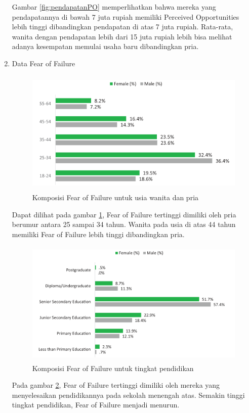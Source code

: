 \begin{enumerate}
Gambar \ref{fig:pendapatanPO} memperlihatkan bahwa mereka yang pendapatannya di bawah 7 juta rupiah memiliki Perceived Opportunities lebih tinggi dibandingkan pendapatan di atas 7 juta rupiah. Rata-rata, wanita dengan pendapatan lebih dari 15 juta rupiah lebih bisa melihat adanya kesempatan memulai usaha baru dibandingkan pria.
	\item Data Fear of Failure
\begin{figure} [H]
	\centering  
	\includegraphics[width=13cm, height=6cm]{usiaFF2013} 
	\caption[Komposisi Fear of Failure untuk usia wanita dan pria]{Komposisi Fear of Failure untuk usia wanita dan pria} 
	\label{fig:umurFF} 
\end{figure} 

Dapat dilihat pada gambar \ref{fig:umurFF}, Fear of Failure tertinggi dimiliki oleh pria berumur antara 25 sampai 34 tahun. Wanita pada usia di atas 44 tahun memiliki Fear of Failure lebih tinggi dibandingkan pria.

\begin{figure} [H]
	\centering  
	\includegraphics[width=13cm, height=6cm]{pendidikanFF2013} 
	\caption[Komposisi Fear of Failure untuk tingkat pendidikan]{Komposisi Fear of Failure untuk tingkat pendidikan} 
	\label{fig:pendidikanFF} 
\end{figure} 

Pada gambar \ref{fig:pendidikanFF}, Fear of Failure tertinggi dimiliki oleh mereka yang menyelesaikan pendidikannya pada sekolah menengah atas. Semakin tinggi tingkat pendidikan, Fear of Failure menjadi menurun.


\end{enumerate}
